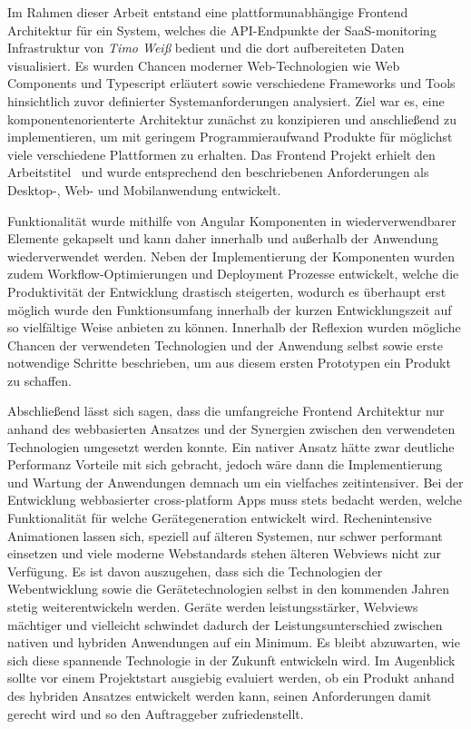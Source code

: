 Im Rahmen dieser Arbeit entstand eine plattformunabhängige Frontend Architektur für ein System,
welches die API-Endpunkte der SaaS-monitoring Infrastruktur von \emph{Timo Weiß} bedient und die dort aufbereiteten Daten visualisiert.
Es wurden Chancen moderner Web-Technologien wie Web Components und Typescript erläutert
sowie verschiedene Frameworks und Tools hinsichtlich zuvor definierter Systemanforderungen analysiert.
Ziel war es, eine komponentenorienterte Architektur zunächst zu konzipieren und anschließend zu implementieren, um
mit geringem Programmieraufwand Produkte für möglichst viele verschiedene Plattformen zu erhalten.
Das Frontend Projekt erhielt den Arbeitstitel \projectname{} und wurde entsprechend den beschriebenen Anforderungen
als Desktop-, Web- und Mobilanwendung entwickelt.

Funktionalität wurde mithilfe von Angular Komponenten in wiederverwendbarer
Elemente gekapselt und kann daher innerhalb und außerhalb der Anwendung wiederverwendet werden.
Neben der Implementierung der Komponenten wurden zudem Workflow-Optimierungen und Deployment Prozesse entwickelt,
welche die Produktivität der Entwicklung drastisch steigerten, wodurch es überhaupt erst möglich wurde den Funktionsumfang
innerhalb der kurzen Entwicklungszeit auf so vielfältige Weise anbieten zu können.
Innerhalb der Reflexion wurden mögliche Chancen der verwendeten Technologien und der Anwendung selbst
sowie erste notwendige Schritte beschrieben, um aus diesem ersten
Prototypen ein Produkt zu schaffen.

Abschließend lässt sich sagen, dass die umfangreiche Frontend Architektur nur anhand des webbasierten Ansatzes und der Synergien zwischen den verwendeten Technologien umgesetzt werden konnte.
Ein nativer Ansatz hätte zwar deutliche Performanz Vorteile mit sich gebracht, jedoch wäre dann die Implementierung und Wartung der Anwendungen demnach um ein vielfaches zeitintensiver.
Bei der Entwicklung webbasierter cross-platform Apps muss stets bedacht werden, welche Funktionalität für welche Gerätegeneration entwickelt wird.
Rechenintensive Animationen lassen sich, speziell auf älteren Systemen, nur schwer performant einsetzen und viele moderne Webstandards stehen älteren Webviews nicht zur Verfügung.
Es ist davon auszugehen, dass sich die Technologien der Webentwicklung sowie die Gerätetechnologien selbst in den kommenden Jahren stetig weiterentwickeln werden.
Geräte werden leistungsstärker, Webviews mächtiger und vielleicht schwindet dadurch der Leis­tungs­un­ter­schied zwischen nativen und hybriden Anwendungen auf ein Minimum.
Es bleibt abzuwarten, wie sich diese spannende Technologie in der Zukunft entwickeln wird.
Im Augenblick sollte vor einem Projektstart ausgiebig evaluiert werden,
ob ein Produkt anhand des hybriden Ansatzes entwickelt werden kann, seinen Anforderungen damit gerecht wird und so den Auftraggeber zufriedenstellt.
